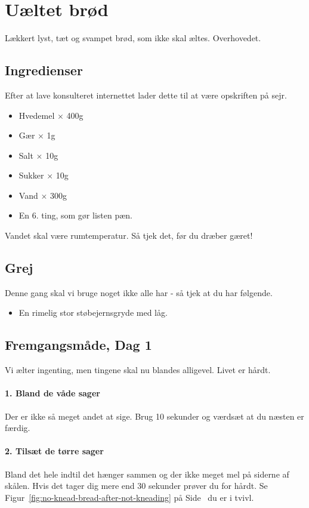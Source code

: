 \section{Uæltet brød}
Lækkert lyst, tæt og svampet brød, som ikke skal æltes. Overhovedet.

\subsection{Ingredienser}
Efter at lave konsulteret internettet lader dette til at være opskriften på sejr.

\begin{multicols}{2}
	\begin{itemize}
		\item Hvedemel $\times$ 400g
		\item Gær $\times$ 1g
		\item Salt $\times$ 10g
		\item Sukker $\times$ 10g
		\item Vand $\times$ 300g
		\item En 6. ting, som gør listen pæn.
	\end{itemize}
\end{multicols}

Vandet skal være rumtemperatur. Så tjek det, før du dræber gæret!

\subsection{Grej}
Denne gang skal vi bruge noget ikke alle har - så tjek at du har følgende.

\begin{itemize}
	\item En rimelig stor støbejernsgryde med låg.
\end{itemize}

\subsection{Fremgangsmåde, Dag 1}
Vi ælter ingenting, men tingene skal nu blandes alligevel. Livet er hårdt.

\paragraph*{1. Bland de våde sager}
Der er ikke så meget andet at sige. Brug 10 sekunder og værdsæt at du næsten er færdig.

\paragraph*{2. Tilsæt de tørre sager}
Bland det hele indtil det hænger sammen og der ikke meget mel på siderne af skålen. Hvis det tager dig mere end 30 sekunder prøver du for hårdt. Se Figur~\ref{fig:no-knead-bread-after-not-kneading} på Side~\pageref{fig:no-knead-bread-after-not-kneading} du er i tvivl.

